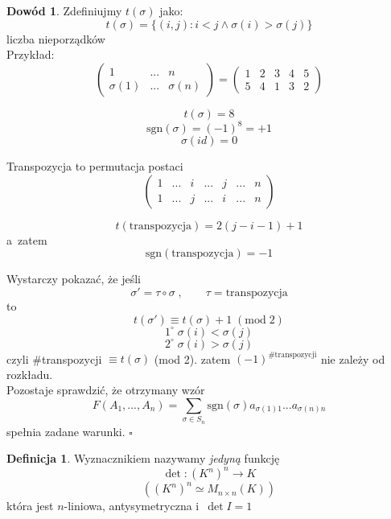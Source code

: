 \documentclass[12pt,a4paper]{article}
\renewcommand{\qed}{$\square$}
\theoremstyle{plain}
\theoremstyle{definition}
\theoremstyle{definition}
\newtheorem{df}{Definicja}[section]
\theoremstyle{definition}
\theoremstyle{definition}
\newtheorem*{dd}{Dowód}
\theoremstyle{definition}
\theoremstyle{definition}
\theoremstyle{definition}
\theoremstyle{definition}
\theoremstyle{definition}
\begin{document}
\begin{dd}
    Zdefiniujmy $t(\sigma)$ jako:
  \[t(\sigma)=\{(i,j): i<j \land \sigma(i)>\sigma(j)\}\]
  liczba nieporządków\\
  Przykład:
  \[\begin{pmatrix}1&...&n\\\sigma(1)&...&\sigma(n)\end{pmatrix}
    =\begin{pmatrix}1&2&3&4&5\\5&4&1&3&2\end{pmatrix}\]

  \[t(\sigma) = 8\]
  \[\mathrm{sgn}(\sigma) = (-1)^8 = +1\]
  \[\sigma(id) = 0\]

  Transpozycja to permutacja postaci
  \[\begin{pmatrix}
    1&...&i&...&j&...&n\\
    1&...&j&...&i&...&n
  \end{pmatrix}\]

  \[t(\mathrm{transpozycja})=2(j-i-1)+1\]
  a~zatem
  \[\mathrm{sgn}(\mathrm{transpozycja})=-1\]

  Wystarczy pokazać, że jeśli
  \[\sigma' = \tau \circ \sigma\;,\qquad \tau=\mathrm{transpozycja}\]
  to
  \[t(\sigma') \equiv t(\sigma)+1 \;(\mathrm{mod}\; 2)\]
  \[1^\circ\; \sigma(i) < \sigma(j)\]
  \[2^\circ\; \sigma(i) > \sigma(j)\]
  czyli \#transpozycji $\equiv t(\sigma)$ (mod 2).
  zatem $(-1)^{\#\mathrm{transpozycji}}$ nie zależy od rozkładu.\\
  Pozostaje sprawdzić, że otrzymany wzór
  \[F(A_1, ..., A_n)=\sum_{\sigma \in S_n}\mathrm{sgn}(\sigma)a_{\sigma(1)1}...a_{\sigma(n)n}\]
  spełnia zadane warunki. \qed
\end{dd}

\begin{df}
    Wyznacznikiem nazywamy \textit{jedyną} funkcję
  \[\det: (K^n)^n \rightarrow K\]
  \[\left((K^n)^n \simeq M_{n \times n}(K)\right)\]
  która jest $n$-liniowa, antysymetryczna i~$\det I=1$
\end{df}
\end{document}
